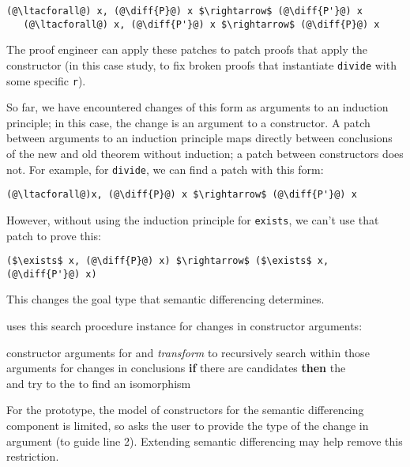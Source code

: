 \begin{lstlisting}[language=coq]
   (@\ltacforall@) x, (@\diff{P}@) x $\rightarrow$ (@\diff{P'}@) x
   (@\ltacforall@) x, (@\diff{P'}@) x $\rightarrow$ (@\diff{P}@) x
\end{lstlisting}
The proof engineer can apply these patches to patch proofs that apply the constructor (in this case study,
to fix broken proofs that instantiate \lstinline{divide} with some specific \lstinline{r}).

So far, we have encountered changes of this form as arguments to an 
induction principle; in this case, the change is an argument to a constructor.
A patch between arguments to an induction principle maps
directly between conclusions of the new and old theorem without
induction; a patch between constructors does not.
For example, for \lstinline{divide}, we can find a patch with this form:

\begin{lstlisting}[language=coq]
   (@\ltacforall@)x, (@\diff{P}@) x $\rightarrow$ (@\diff{P'}@) x
\end{lstlisting}
However, without using the induction principle for \lstinline{exists}, we can't use that patch to prove this:

\begin{lstlisting}[language=coq]
   ($\exists$ x, (@\diff{P}@) x) $\rightarrow$ ($\exists$ x, (@\diff{P'}@) x)
\end{lstlisting}
This changes the goal type that semantic differencing determines.

\sysname uses this search procedure instance for changes in constructor arguments:

\begin{algorithm}
\footnotesize
\begin{algorithmic}[1]
    \STATE {} constructor arguments for 
    \STATE {} and \textit{transform} to recursively search within those arguments for changes in conclusions
    \STATE \textbf{if} there are candidates \textbf{then}
    \STATE \hspace*{1em}  the  \\
           \hspace*{1em}  and try to  the  to find an isomorphism
\end{algorithmic}
\end{algorithm}
For the prototype, the model of constructors for the semantic differencing component is limited,
so \sysname asks the user to provide the type of the change in argument (to guide line 2).
Extending semantic differencing may help remove this restriction.




